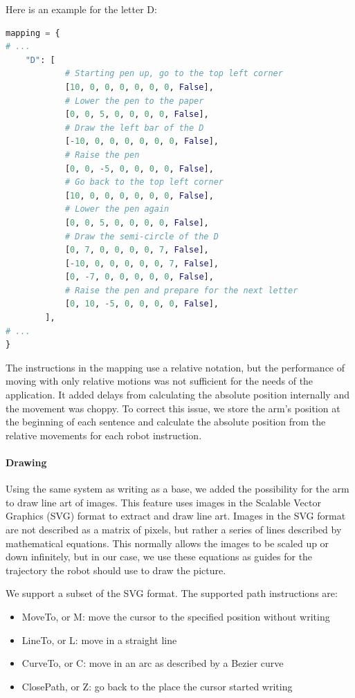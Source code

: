 
Here is an example for the letter D:

\begin{lstlisting}[language=Python, caption=Example for the letter D]
mapping = {
# ...
    "D": [
            # Starting pen up, go to the top left corner
            [10, 0, 0, 0, 0, 0, 0, False],
            # Lower the pen to the paper
            [0, 0, 5, 0, 0, 0, 0, False],
            # Draw the left bar of the D
            [-10, 0, 0, 0, 0, 0, 0, False],
            # Raise the pen
            [0, 0, -5, 0, 0, 0, 0, False],
            # Go back to the top left corner
            [10, 0, 0, 0, 0, 0, 0, False],
            # Lower the pen again
            [0, 0, 5, 0, 0, 0, 0, False],
            # Draw the semi-circle of the D
            [0, 7, 0, 0, 0, 0, 7, False],
            [-10, 0, 0, 0, 0, 0, 7, False],
            [0, -7, 0, 0, 0, 0, 0, False],
            # Raise the pen and prepare for the next letter
            [0, 10, -5, 0, 0, 0, 0, False],
        ],
# ...
}
\end{lstlisting}

The instructions in the mapping use a relative notation, but the performance of moving with only relative motions was not sufficient for the needs of the application. It added delays from calculating the absolute position internally and the movement was choppy. To correct this issue, we store the arm's position at the beginning of each sentence and calculate the absolute position from the relative movements for each robot instruction.

\paragraph{Drawing}

Using the same system as writing as a base, we added the possibility for the arm to draw line art of images. This feature uses images in the Scalable Vector Graphics (SVG) format to extract and draw line art. Images in the SVG format are not described as a matrix of pixels, but rather a series of lines described by mathematical equations. This normally allows the images to be scaled up or down infinitely, but in our case, we use these equations as guides for the trajectory the robot should use to draw the picture.

We support a subset of the SVG format. The supported path instructions are:

\begin{itemize}
    \item MoveTo, or M: move the cursor to the specified position without writing
    \item LineTo, or L: move in a straight line
    \item CurveTo, or C: move in an arc as described by a Bezier curve
    \item ClosePath, or Z: go back to the place the cursor started writing
\end{itemize}


